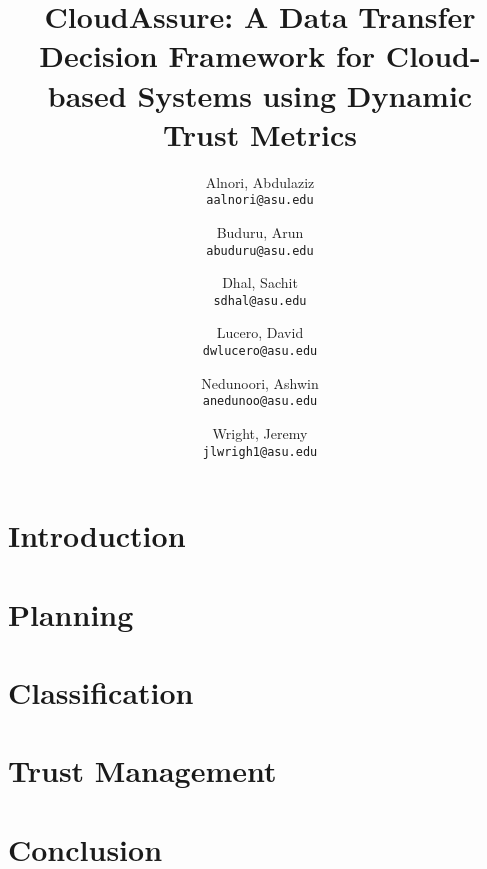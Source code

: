 \documentclass[12pt,a4paper]{report}
\title{CloudAssure: A Data Transfer Decision Framework for 
Cloud-based Systems using Dynamic Trust 
Metrics}
\author{
    Alnori, Abdulaziz \\ 
    \texttt{aalnori@asu.edu}
    \and
    Buduru, Arun\\
    \texttt{abuduru@asu.edu}
    \and
    Dhal, Sachit\\
    \texttt{sdhal@asu.edu}
    \and
    Lucero, David\\ 
    \texttt{dwlucero@asu.edu}
    \and
    Nedunoori, Ashwin\\
    \texttt{anedunoo@asu.edu}
    \and
    Wright, Jeremy\\
    \texttt{jlwrigh1@asu.edu}
}
\begin{document}
\maketitle
\tableofcontents
\printglossaries
\chapter{Introduction}


\chapter{Planning}


\chapter{Classification}


\chapter{Trust Management}


\chapter{Conclusion}


\clearpage
\printbibliography
\end{document}
